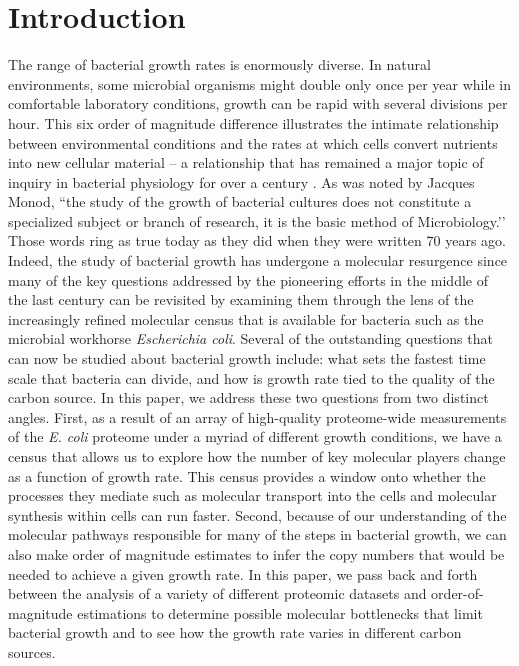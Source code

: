 

\section{Introduction}
The range of bacterial growth rates is enormously diverse. In natural
environments, some microbial organisms might double only once per year while
in comfortable laboratory conditions, growth can be rapid with several
divisions per hour. This six order of magnitude difference illustrates the intimate
relationship between environmental conditions and the rates at which cells
convert nutrients into new cellular material -- a relationship that has remained a major topic
of inquiry in bacterial physiology for over a century \citep{jun2018}. As was
noted by Jacques Monod, ``the study of the growth of bacterial cultures does
not constitute a specialized subject or branch of research, it is the basic
method of Microbiology.’’ Those words ring as true today as they did when
they were written 70 years ago. Indeed, the study of bacterial growth has
undergone a molecular resurgence since many of the key questions addressed by
the pioneering efforts in the middle of the last century can be revisited by
examining them through the lens of the increasingly refined molecular census
that is available for bacteria such as the microbial workhorse
\textit{Escherichia coli}. Several of the outstanding questions that can now
be studied about bacterial growth include: what sets the fastest time scale
that bacteria can divide, and how is growth rate tied to the quality of the
carbon source. In this paper, we address these two questions from two
distinct angles. First, as a result of an array of high-quality proteome-wide
measurements of the \textit{E. coli} proteome under a myriad of different
growth conditions, we have a census that allows us to explore how the number
of key molecular players change as a function of growth rate. This census
provides a window onto whether the processes they mediate such as molecular
transport into the cells and molecular synthesis within cells can run faster.
Second, because of our understanding of the molecular pathways responsible
for many of the steps in bacterial growth, we can also make order of
magnitude estimates to infer the copy numbers that would be needed to achieve
a given growth rate. In this paper, we pass back and forth between the
analysis of a variety of different proteomic datasets and order-of-magnitude
estimations to determine possible molecular bottlenecks that limit bacterial
growth and to see how the growth rate varies in different carbon sources.

